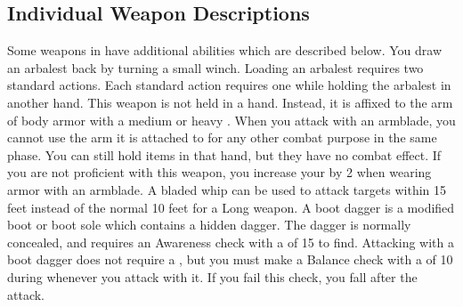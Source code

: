   \subsection{Individual Weapon Descriptions}
    Some weapons in  have additional abilities which are described below.
     You draw an arbalest back by turning a small winch. Loading an arbalest requires two standard actions.
    Each standard action requires one  while holding the arbalest in another hand.
     This weapon is not held in a hand.
    Instead, it is affixed to the arm of body armor with a medium or heavy .
    When you attack with an armblade, you cannot use the arm it is attached to for any other combat purpose in the same phase.
    You can still hold items in that hand, but they have no combat effect.
    If you are not proficient with this weapon, you increase your  by 2 when wearing armor with an armblade.
     A bladed whip can be used to attack targets within 15 feet instead of the normal 10 feet for a Long weapon.
     A boot dagger is a modified boot or boot sole which contains a hidden dagger.
    The dagger is normally concealed, and requires an Awareness check with a  of 15 to find.
    Attacking with a boot dagger does not require a , but you must make a Balance check with a  of 10 during whenever you attack with it.
    If you fail this check, you fall \prone after the attack.


